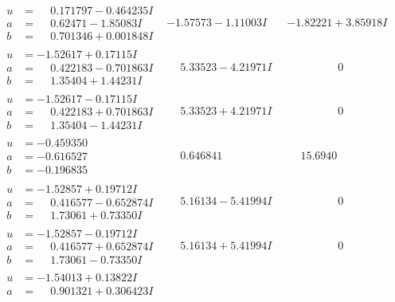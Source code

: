 \documentclass[1p]{elsarticle_modified}
\theoremstyle{definition}
\begin{document}
$$\begin{array}{c|c|c}
\begin{aligned}
u &= \phantom{-}0.171797 - 0.464235 I \\
a &= \phantom{-}0.62471 - 1.85083 I \\
b &= \phantom{-}0.701346 + 0.001848 I\end{aligned}
 & -1.57573 - 1.11003 I & -1.82221 + 3.85918 I \\ \hline\begin{aligned}
u &= -1.52617 + 0.17115 I \\
a &= \phantom{-}0.422183 - 0.701863 I \\
b &= \phantom{-}1.35404 + 1.44231 I\end{aligned}
 & \phantom{-}5.33523 - 4.21971 I & \phantom{-0.000000 } 0 \\ \hline\begin{aligned}
u &= -1.52617 - 0.17115 I \\
a &= \phantom{-}0.422183 + 0.701863 I \\
b &= \phantom{-}1.35404 - 1.44231 I\end{aligned}
 & \phantom{-}5.33523 + 4.21971 I & \phantom{-0.000000 } 0 \\ \hline\begin{aligned}
u &= -0.459350\phantom{ +0.000000I} \\
a &= -0.616527\phantom{ +0.000000I} \\
b &= -0.196835\phantom{ +0.000000I}\end{aligned}
 & \phantom{-}0.646841\phantom{ +0.000000I} & \phantom{-}15.6940\phantom{ +0.000000I} \\ \hline\begin{aligned}
u &= -1.52857 + 0.19712 I \\
a &= \phantom{-}0.416577 - 0.652874 I \\
b &= \phantom{-}1.73061 + 0.73350 I\end{aligned}
 & \phantom{-}5.16134 - 5.41994 I & \phantom{-0.000000 } 0 \\ \hline\begin{aligned}
u &= -1.52857 - 0.19712 I \\
a &= \phantom{-}0.416577 + 0.652874 I \\
b &= \phantom{-}1.73061 - 0.73350 I\end{aligned}
 & \phantom{-}5.16134 + 5.41994 I & \phantom{-0.000000 } 0 \\ \hline\begin{aligned}
u &= -1.54013 + 0.13822 I \\
a &= \phantom{-}0.901321 + 0.306423 I \\

\end{aligned}
\end{array}$$
\end{document}

